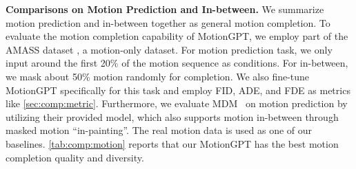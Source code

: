 \textbf{Comparisons on Motion Prediction and In-between.}
\label{sec:comp:motion}
We summarize motion prediction and in-between together as general motion completion.
To evaluate the motion completion capability of MotionGPT, we employ part of the AMASS dataset \cite{AMASS_ICCV2019}, a motion-only dataset. 
For motion prediction task, we only input around the first 20\% of the motion sequence as conditions. For in-between, we mask about 50\% motion randomly for completion.
%
We also fine-tune MotionGPT specifically for this task and employ FID, ADE, and FDE as metrics like \cref{sec:comp:metric}.
%
Furthermore, we evaluate MDM~\cite{mdm2022human} on motion prediction by utilizing their provided model, which also supports motion in-between through masked motion ``in-painting''.
%
The real motion data is used as one of our baselines.
%
\cref{tab:comp:motion} reports that our MotionGPT has the best motion completion quality and diversity.


\begin{table}[h]
\centering
{}
\vspace{4pt}
\caption{Comparison of motion prediction and motion in-between on part of AMASSS~\cite{AMASS_ICCV2019} dataset using motion data only. 
FID indicates motion quality and Diversity (DIV) for motion diversity within each condition. ADE and FDE are joints distance between generation and ground truth.}
\vspace{-10pt}
\label{tab:comp:motion}
\end{table}

